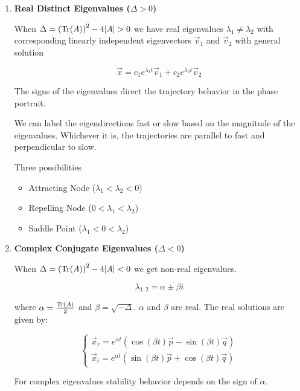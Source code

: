     \begin{enumerate}
        \item \textbf{Real Distinct Eigenvalues ($\Delta > 0$)}

            When $\Delta = {({\rm Tr}(A))}^2 - 4|A| > 0$ we have real eigenvalues $\lambda_1 \neq \lambda_2$ with corresponding linearly independent eigenvectors $\vec{v}_1$ and $\vec{v}_2$ with general solution

            \[ \vec{x} = c_1 e^{\lambda_1 t} \vec{v}_1 + c_2 e^{\lambda_2 t} \vec{v}_2 \]

            The signs of the eigenvalues direct the trajectory behavior in the phase portrait.

            We can label the eigendirections fast or slow based on the magnitude of the eigenvalues. Whichever it is, the trajectories are parallel to fast and perpendicular to slow.

            Three possibilities

                \begin{itemize}
                    \item Attracting Node ($\lambda_1 < \lambda_2 < 0$)
                    \item Repelling Node ($0 < \lambda_1 < \lambda_2$)
                    \item Saddle Point ($\lambda_1 < 0 < \lambda_2$)
                \end{itemize}

            \item \textbf{Complex Conjugate Eigenvalues ($\Delta < 0$)}

                When $\Delta = {({\rm Tr}(A))}^2 - 4|A| < 0$ we get non-real eigenvalues.

                \[ \lambda_{1,2} = \alpha \pm \beta i \]

                where $\alpha = \frac{{\rm Tr}(A)}{2}$ and $\beta = \sqrt{-\Delta}$. $\alpha$ and $\beta$ are real. The real solutions are given by:

                \[ \begin{cases}
                        \vec{x}_r = e^{\alpha t} ( \cos(\beta t) \vec{p} - \sin(\beta t)\vec{q})\\
                        \vec{x}_i = e^{\alpha t} ( \sin(\beta t) \vec{p} + \cos(\beta t)\vec{q})
                    \end{cases} \]

                For complex eigenvalues stability behavior depends on the sign of $\alpha$.


\end{enumerate}
